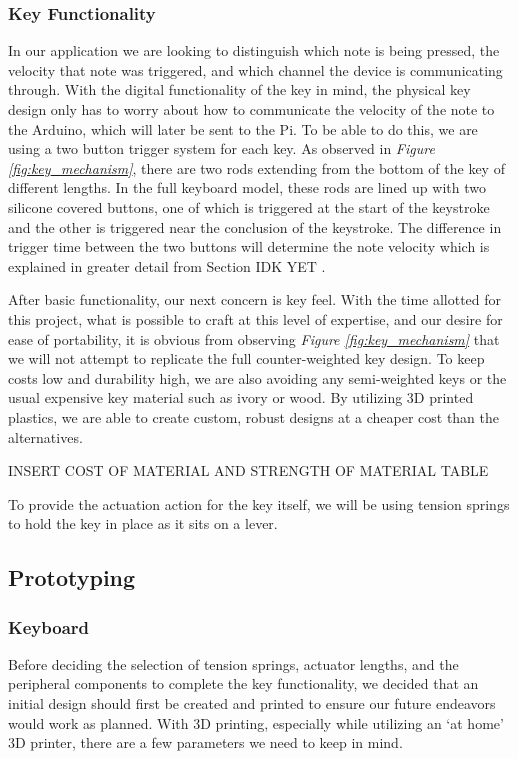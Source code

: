 \subsubsection{Key Functionality}

In our application we are looking to distinguish which note is being pressed, the velocity that note was triggered, and which channel the device is communicating through. With the digital functionality of the key in mind, the physical key design only has to worry about how to communicate the velocity of the note to the Arduino, which will later be sent to the Pi. To be able to do this, we are using a two button trigger system for each key. As observed in \textit{Figure \ref{fig:key_mechanism}}, there are two rods extending from the bottom of the key of different lengths. In the full keyboard model, these rods are lined up with two silicone covered buttons, one of which is triggered at the start of the keystroke and the other is triggered near the conclusion of the keystroke. The difference in trigger time between the two buttons will determine the note velocity which is explained in greater detail from Section IDK YET .

After basic functionality, our next concern is key feel. With the time allotted for this project, what is possible to craft at this level of expertise, and our desire for ease of portability, it is obvious from observing \textit{Figure \ref{fig:key_mechanism}} that we will not attempt to replicate the full counter-weighted key design. To keep costs low and durability high, we are also avoiding any semi-weighted keys or the usual expensive key material such as ivory or wood. By utilizing 3D printed plastics, we are able to create custom, robust designs at a cheaper cost than the alternatives.

    INSERT COST OF MATERIAL AND STRENGTH OF MATERIAL TABLE

To provide the actuation action for the key itself, we will be using tension springs to hold the key in place as it sits on a lever.

\subsection{Prototyping}

\subsubsection{Keyboard}

Before deciding the selection of tension springs, actuator lengths, and the peripheral components to complete the key functionality, we decided that an initial design should first be created and printed to ensure our future endeavors would work as planned. With 3D printing, especially while utilizing an ‘at home’ 3D printer, there are a few parameters we need to keep in mind.

